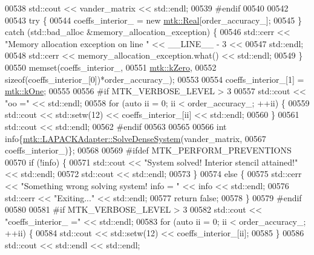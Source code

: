 \begin{DoxyCode}
{{00538   std::cout << vander\_matrix << std::endl;
00539 \textcolor{preprocessor}{  #endif}
00540 
00542 
00543   \textcolor{keywordflow}{try} \{
00544     coeffs\_interior\_ = \textcolor{keyword}{new} \hyperlink{group__c01-roots_gac080bbbf5cbb5502c9f00405f894857d}{mtk::Real}[order\_accuracy\_];
00545   \} \textcolor{keywordflow}{catch} (std::bad\_alloc &memory\_allocation\_exception) \{
00546     std::cerr << \textcolor{stringliteral}{"Memory allocation exception on line "} << \_\_LINE\_\_ - 3 <<
00547       std::endl;
00548     std::cerr << memory\_allocation\_exception.what() << std::endl;
00549   \}
00550   memset(coeffs\_interior\_,
00551          \hyperlink{group__c01-roots_ga59a451a5fae30d59649bcda274fea271}{mtk::kZero},
00552          \textcolor{keyword}{sizeof}(coeffs\_interior\_[0])*order\_accuracy\_);
00553 
00554   coeffs\_interior\_[1] = \hyperlink{group__c01-roots_ga26407c24d43b6b95480943340d285c71}{mtk::kOne};
00555 
00556 \textcolor{preprocessor}{  #if MTK\_VERBOSE\_LEVEL > 3}
00557   std::cout << \textcolor{stringliteral}{"oo ="} << std::endl;
00558   \textcolor{keywordflow}{for} (\textcolor{keyword}{auto} ii = 0; ii < order\_accuracy\_; ++ii) \{
00559     std::cout << std::setw(12) << coeffs\_interior\_[ii] << std::endl;
00560   \}
00561   std::cout << std::endl;
00562 \textcolor{preprocessor}{  #endif}
00563 
00565 
00566   \textcolor{keywordtype}{int} info\{\hyperlink{classmtk_1_1LAPACKAdapter_a7428bccf74fd4a4af68fb7233846da22}{mtk::LAPACKAdapter::SolveDenseSystem}(vander\_matrix,
00567                                                 coeffs\_interior\_)\};
00568 
00569 \textcolor{preprocessor}{  #ifdef MTK\_PERFORM\_PREVENTIONS}
00570   \textcolor{keywordflow}{if} (!info) \{
00571     std::cout << \textcolor{stringliteral}{"System solved! Interior stencil attained!"} << std::endl;
00572     std::cout << std::endl;
00573   \}
00574   \textcolor{keywordflow}{else} \{
00575     std::cerr << \textcolor{stringliteral}{"Something wrong solving system! info = "} << info << std::endl;
00576     std::cerr << \textcolor{stringliteral}{"Exiting..."} << std::endl;
00577     \textcolor{keywordflow}{return} \textcolor{keyword}{false};
00578   \}
00579 \textcolor{preprocessor}{  #endif}
00580 
00581 \textcolor{preprocessor}{  #if MTK\_VERBOSE\_LEVEL > 3}
00582   std::cout << \textcolor{stringliteral}{"coeffs\_interior\_ ="} << std::endl;
00583   \textcolor{keywordflow}{for} (\textcolor{keyword}{auto} ii = 0; ii < order\_accuracy\_; ++ii) \{
00584     std::cout << std::setw(12) << coeffs\_interior\_[ii];
00585   \}
00586   std::cout << std::endl << std::endl;
}}
\end{DoxyCode}
